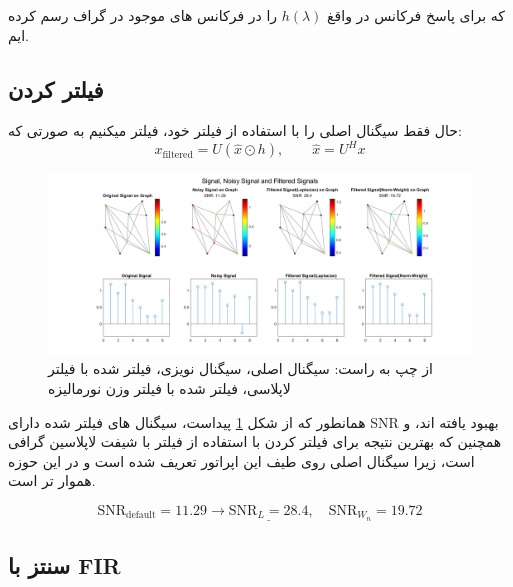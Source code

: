 که برای پاسخ فرکانس در واقغ $h(\lambda)$ را در فرکانس های موجود در گراف رسم کرده ایم.

\clearpage
\subsection{فیلتر کردن}

حال فقط سیگنال اصلی را با استفاده از فیلتر خود، فیلتر میکنیم به صورتی که:
\[
	x_{\text{filtered}}=U(\hat{x}\odot h),\qquad \hat{x}=U^Hx
\]

\begin{figure}[h]
	\centering
	\includegraphics*[width=\linewidth]{../results/Q1/sig_filtsig.png}
	\vspace*{-2em}
	\caption{از چپ به راست: سیگنال اصلی، سیگنال نویزی، فیلتر شده با فیلتر لاپلاسی، فیلتر شده با فیلتر وزن نورمالیزه}
	\label{fig:filtered_sig_ideal}
\end{figure}

همانطور که از شکل \ref*{fig:filtered_sig_ideal} پیداست، سیگنال های فیلتر شده دارای SNR بهبود یافته اند، و
همچنین که بهترین نتیجه برای فیلتر کردن با استفاده از فیلتر با شیفت لاپلاسین گرافی است، زیرا
سیگنال اصلی روی طیف این اپراتور تعریف شده است و در این حوزه هموار تر است.

\[
	\text{SNR}_{\text{default}}=11.29\longrightarrow \underline{\text{SNR}_{L}=28.4},\quad \text{SNR}_{W_n}=19.72
\]

\subsection{سنتز با FIR}

